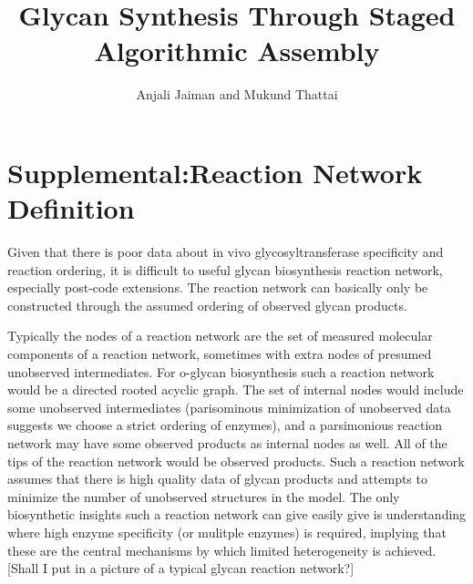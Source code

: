 \documentclass{article}
\begin{document}
\graphicspath{ {Images/} }
\sectionfont{\fontsize{11}{0}\selectfont}
\setlength{\headsep}{0pt}


\setlength{\parindent}{0pt}

\title{Glycan Synthesis Through Staged Algorithmic Assembly}
\author{Anjali Jaiman and Mukund Thattai}
\maketitle


\section*{Supplemental:Reaction Network Definition}


Given that there is poor data about in vivo glycosyltransferase specificity and reaction ordering, it is difficult to useful glycan biosynthesis reaction network, especially post-code extensions. The reaction network can basically only be constructed through the assumed ordering of observed glycan products.

Typically the nodes of a reaction network are the set of measured molecular components of a reaction network, sometimes with extra nodes of presumed unobserved intermediates. For o-glycan biosynthesis such a reaction network would be a directed rooted acyclic graph. The set of internal nodes would include some unobserved intermediates (parisominous minimization of unobserved data suggests we choose a strict ordering of enzymes), and a parsimonious reaction network may have some observed products as internal nodes as well. All of the tips of the reaction network would be observed products. Such a reaction network assumes that there is high quality data of glycan products and attempts to minimize the number of unobserved structures in the model. The only biosynthetic insights such a reaction network can give easily give is understanding where high enzyme specificity (or mulitple enzymes) is required, implying that these are the central mechanisms by which limited heterogeneity is achieved. [Shall I put in a picture of a typical glycan reaction network?]
\end{document}
